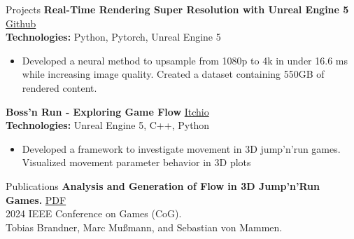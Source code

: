 \documentclass{resume} %
\begin{document}
\begin{rSection}{Projects}
{\bf Real-Time Rendering Super Resolution with Unreal Engine 5} \hfill {\href{https://github.com/BrandnerKasper/URTSR}{Github}} \\
{\bf Technologies:} Python, Pytorch, Unreal Engine 5
\begin{itemize}
    \item Developed a neural method to upsample from 1080p to 4k in under 16.6 ms while increasing image quality. Created a dataset containing 550GB of rendered content.
\end{itemize}

{\bf Boss'n Run - Exploring Game Flow} \hfill {\href{https://brandnerkasper.itch.io/bossn-run}{Itchio}} \\
{\bf Technologies:} Unreal Engine 5, C++, Python
\begin{itemize}
    \item Developed a framework to investigate movement in 3D jump'n'run games. Visualized movement parameter behavior in 3D plots
\end{itemize}
\end{rSection}

\begin{rSection}{Publications}
{\bf Analysis and Generation of Flow in 3D Jump’n’Run Games.} \hfill {\href{https://ieeexplore.ieee.org/abstract/document/10645536}{PDF}}\\
2024 IEEE Conference on Games (CoG).\\
Tobias Brandner, Marc Mußmann, and Sebastian von Mammen.\\

\end{rSection}
\end{document}
